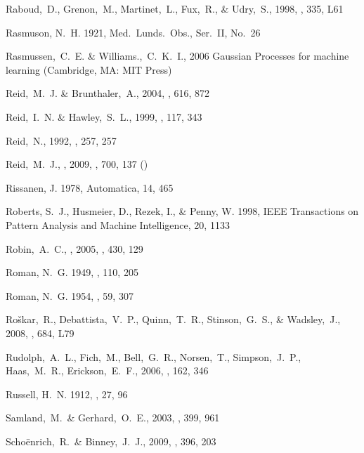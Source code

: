 \begin{thebibliography}{99}
  Raboud,~D., Grenon,~M., Martinet,~L., Fux,~R., \& Udry,~S., 1998,
  \aap, 335, L61

{Rasmuson}, N.~H. 1921, Med.~Lunds.~Obs., {Ser.~II}, {No.~26}

  Rasmussen,~C.~E. \& Williams.,~C.~K.~I., 2006
  Gaussian Processes for machine learning (Cambridge, MA: MIT Press)

  Reid,~M.~J. \& Brunthaler,~A., 2004,
  \apj, 616, 872

  Reid,~I.~N. \& Hawley,~S.~L., 1999,
  \aj, 117, 343

  Reid,~N., 1992,
  \mnras, 257, 257

 Reid,~M.~J., \etal, 2009,
  \apj, 700, 137 (\reid)

{Rissanen}, J. 1978, {Automatica}, 14, 465

{Roberts}, S.~J., {Husmeier}, D., {Rezek}, I., \& {Penny}, W. 1998, IEEE
  Transactions on Pattern Analysis and Machine Intelligence, 20, 1133

  Robin,~A.~C., \etal, 2005,
  \aap, 430, 129

{Roman}, N.~G. 1949, \apj, 110, 205

{Roman}, N.~G. 1954, \aj, 59, 307

  Ro{\v s}kar,~R., Debattista,~V.~P., Quinn,~T.~R., Stinson,~G.~S., \& Wadsley,~J., 2008,
  \apjl, 684, L79

  Rudolph,~A.~L., Fich,~M., Bell,~G.~R., Norsen,~T., Simpson,~J.~P., Haas,~M.~R., Erickson,~E.~F., 2006,
  \apjs, 162, 346

{Russell}, H.~N. 1912, \aj, 27, 96

  Samland,~M.~\& Gerhard,~O.~E., 2003,
  \aap, 399, 961

  Scho\"{e}nrich,~R.~\& Binney,~J.~J., 2009,
  \mnras, 396, 203


\end{thebibliography}
